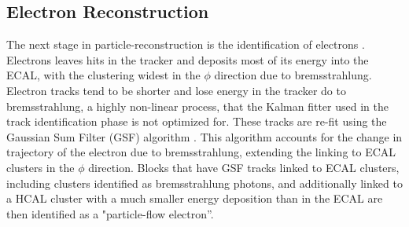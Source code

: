 \subsection{Electron Reconstruction}
\label{electron_reco_overview}

\par The next stage in particle-reconstruction is the identification
of electrons \cite{CMS-PAS-PFT-09-001}.  Electrons leaves hits in the
tracker and deposits most of its energy into the ECAL, with the
clustering widest in the $\phi$ direction due to bremsstrahlung.
Electron tracks tend to be shorter and lose energy in the tracker do
to bremsstrahlung, a highly non-linear process, that the Kalman
fitter used in the track identification phase is not optimized for.
These tracks are re-fit using the Gaussian Sum Filter (GSF) algorithm
\cite{Adam:2005bya}. This algorithm accounts for the change in
trajectory of the electron due to bremsstrahlung, extending the
linking to ECAL clusters in the $\phi$ direction.  Blocks that have
GSF tracks linked to ECAL clusters, including clusters identified as
bremsstrahlung photons, and additionally linked to a HCAL cluster with
a much smaller energy deposition than in the ECAL are then identified
as a "particle-flow electron''.  

